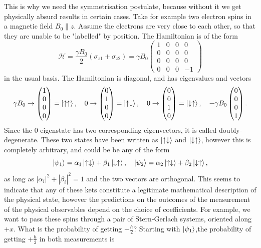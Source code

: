 \documentclass{article}
\begin{document}
This is why we need the symmetrisation postulate, because without it we get physically absurd results in certain cases. Take for example two electron spins in a magnetic field $B_0\parallel z$. Assume the electrons are very close to each other, so that they are unable to be "labelled" by position. The Hamiltonian is of the form 
\[
    \mathcal{H}=\frac{\gamma B_0}{2}\left( \sigma _{z1}+\sigma _{z 2} \right)=\gamma B_0\begin{pmatrix}
        1&0&0&0\\
        0&0&0&0\\
        0&0&0&0\\
        0&0&0&-1
    \end{pmatrix}
\]
in the usual basis. The Hamiltonian is diagonal, and has eigenvalues and vectors 
\[
    \gamma B_0\to\begin{pmatrix}
        1\\0\\0\\0
    \end{pmatrix}=\ket{\uparrow \uparrow},\quad 0\to\begin{pmatrix}
        0\\1\\0\\0
    \end{pmatrix}=\ket{\uparrow \downarrow},\quad 0\to\begin{pmatrix}
        0\\0\\1\\0
    \end{pmatrix}=\ket{\downarrow \uparrow},\quad-\gamma B_0\begin{pmatrix}
        0\\0\\0\\1
    \end{pmatrix}.
\]
Since the $0$ eigenstate has two corresponding eigenvectors, it is called doubly-degenerate. These two states have been written as $\ket{\uparrow \downarrow}$ and $\ket{\downarrow \uparrow}$, however this is completely arbitrary, and could be be any of the form 
\[
    \ket{\psi _1}=\alpha _1 \ket{\uparrow \downarrow}+\beta _1 \ket{\downarrow \uparrow},\quad \ket{\psi _2}=\alpha _2 \ket{\uparrow \downarrow}+\beta _2 \ket{\downarrow \uparrow},
\]
as long as $\left| \alpha _i \right|^2+\left| \beta _i \right|^2=1$ and the two vectors are orthogonal. This seems to indicate that any of these kets constitute a legitimate mathematical description of the physical state, however the predictions on the outcomes of the measurement of the physical observables depend on the choice of coefficients. For example, we want to pass these spins through a pair of Stern-Gerlach systems, oriented along $+x$. What is the probability of getting $+\frac{\hbar}{2}$? Starting with $\ket{\psi _1}$,the  probability of getting $+\frac{\hbar }{2}$ in both measurements is 
\end{document}
